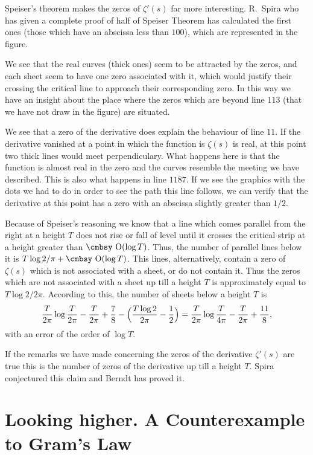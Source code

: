 \documentclass[a4paper]{amsart}
\numberwithin{equation}{section}
\def\Orden{\mathop{\hbox{\cmbsy O}}\nolimits}   %
\begin{document}
\begin{large}
Speiser's theorem makes the zeros of $\zeta'(s)$ far more interesting. R.~Spira
who has given a complete proof of half of Speiser Theorem
 \cite{Sp} has calculated the first ones (those which have an abscissa less than
$100$), which are represented in the figure.

We see that the real curves (thick ones) seem to be attracted by the zeros,
and each sheet seem to have one zero associated with it, which would justify
their crossing the critical line to approach their corresponding zero. In this
way we  have an insight about the place where the zeros which are beyond
line $113$ (that we have not draw in the figure)  are situated.


We see that a zero of the derivative does explain the behaviour of line $11$.
If the derivative vanished at a point in which the function is $\zeta(s)$ is
real, at this point two thick lines would meet perpendiculary. What happens
here is that the function is almost real in the zero and the curves resemble
the meeting we have described. This is also what happens in line $1187$. If we
see the graphics with the dots we had to do in order to see the path this line
follows, we can verify that the derivative at this point has a zero with an abscissa slightly
greater than $1/2$.
\medskip

Because of Speiser's reasoning we know that a line which comes parallel from
the right at a height $T$ does not rise or fall of level until it crosses the
critical strip at a height greater than $\Orden(\log T)$. Thus, the number of
parallel lines below it is $T\log 2/\pi + \Orden(\log T)$. This lines,
alternatively, contain a zero of $\zeta(s)$ which is not associated with a
sheet, or do not contain it. Thus the zeros which are not associated with a
sheet up till a height $T$ is approximately equal to $T\log 2/2\pi$. According
to this, the number of sheets below a height $T$ is
$${T\over2\pi}\log{T\over2\pi}-{T\over2\pi}+{7\over8}-\Bigl({T\log2\over2\pi}-{1\over2}\Bigr)=
{T\over2\pi}\log{T\over4\pi}-{T\over2\pi}+{11\over8},$$
with an error of the order of $\log T$.

If the remarks we have made concerning the zeros of the derivative $\zeta'(s)$
are true this is the number of zeros of the derivative up till a height $T$.
Spira conjectured this claim and Berndt \cite{Be} has proved it.


\section{Looking higher. A Counterexample to  Gram's Law}


\end{large}
\end{document}

